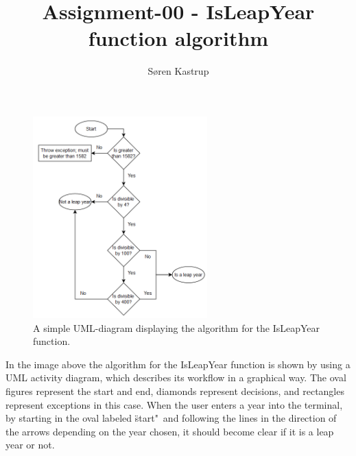 \documentclass{article}
\title{Assignment-00 - IsLeapYear function algorithm}
\author{Søren Kastrup}
\date{}
\begin{document}
    \maketitle
    
    \begin{figure}[h]
        \centering
        \includegraphics[width=0.6\textwidth]{algorithm_diagram.png}
        \caption{\label{fig:isleapyearalgorithm} A simple UML-diagram displaying the algorithm for the IsLeapYear function.}
    \end{figure}
    
    In the image above the algorithm for the IsLeapYear function is shown by using a UML activity diagram, which describes its workflow in a graphical way. The oval figures represent the start and end, diamonds represent decisions, and rectangles represent exceptions in this case. When the user enters a year into the terminal, by starting in the oval labeled \"start"\ and following the lines in the direction of the arrows depending on the year chosen, it should become clear if it is a leap year or not.
\end{document}
